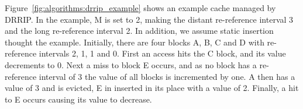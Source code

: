 Figure~\ref{fig:algorithms:drrip_example} shows an example cache managed by DRRIP.
In the example, M is set to 2, making the distant re-reference interval 3 and the long re-reference interval 2. 
In addition, we assume static insertion thought the example.
Initially, there are four blocks A, B, C and D with re-reference intervals 2, 1, 1 and 0.
First an access hits the C block, and its value decrements to 0.
Next a miss to block E occurs, and as no block has a re-reference interval of 3 the value of all blocks is incremented by one. 
A then has a value of 3 and is evicted, E in inserted in its place with a value of 2.
Finally, a hit to E occurs causing its value to decrease.